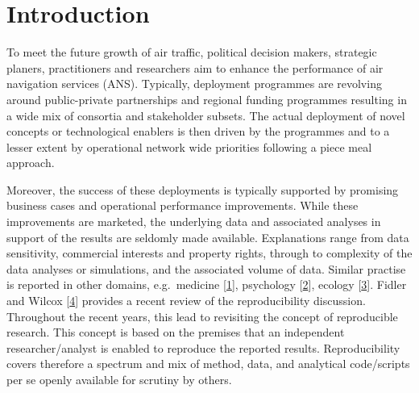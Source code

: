 \documentclass[conference,final,a4paper,]{IEEEtran}
\begin{document}
\hypertarget{introduction}{%
\section{Introduction}\label{introduction}}

To meet the future growth of air traffic, political decision makers, strategic planers, practitioners and researchers aim to enhance the performance of air navigation services (ANS).
Typically, deployment programmes are revolving around public-private partnerships and regional funding programmes resulting in a wide mix of consortia and stakeholder subsets.
The actual deployment of novel concepts or technological enablers is then driven by the programmes and to a lesser extent by operational network wide priorities following a piece meal approach.

Moreover, the success of these deployments is typically supported by promising business cases and operational performance improvements.
While these improvements are marketed, the underlying data and associated analyses in support of the results are seldomly made available.
Explanations range from data sensitivity, commercial interests and property rights, through to complexity of the data analyses or simulations, and the associated volume of data.
Similar practise is reported in other domains, e.g.~medicine {[}\protect\hyperlink{ref-kolata_2011}{1}{]}, psychology {[}\protect\hyperlink{ref-ritchie_2012}{2}{]}, ecology {[}\protect\hyperlink{ref-fraser_etal_2018}{3}{]}. Fidler and Wilcox {[}\protect\hyperlink{ref-fidler_wilcox_2018}{4}{]} provides a recent review of the reproducibility discussion.
Throughout the recent years, this lead to revisiting the concept of reproducible research.
This concept is based on the premises that an independent researcher/analyst is enabled to reproduce the reported results.
Reproducibility covers therefore a spectrum and mix of method, data, and analytical code/scripts per se openly available for scrutiny by others.
\end{document}
